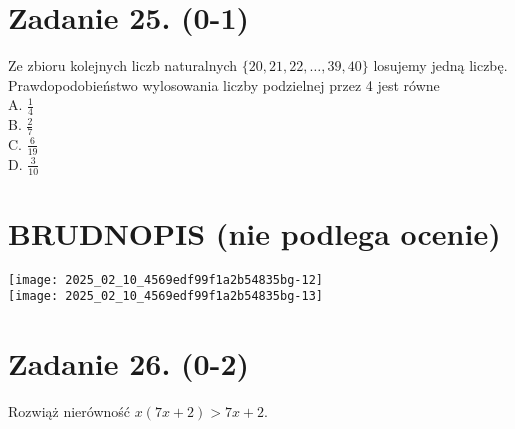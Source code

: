 \documentclass[10pt]{article}
\begin{document}
\section*{Zadanie 25. (0-1)}
Ze zbioru kolejnych liczb naturalnych \(\{20,21,22, \ldots, 39,40\}\) losujemy jedną liczbę. Prawdopodobieństwo wylosowania liczby podzielnej przez 4 jest równe\\
A. \(\frac{1}{4}\)\\
B. \(\frac{2}{7}\)\\
C. \(\frac{6}{19}\)\\
D. \(\frac{3}{10}\)

\section*{BRUDNOPIS (nie podlega ocenie)}
\texttt{[image: 2025\_02\_10\_4569edf99f1a2b54835bg-12]}\\
\texttt{[image: 2025\_02\_10\_4569edf99f1a2b54835bg-13]}

\section*{Zadanie 26. (0-2)}
Rozwiąż nierówność \(x(7 x+2)>7 x+2\).
\end{document}
